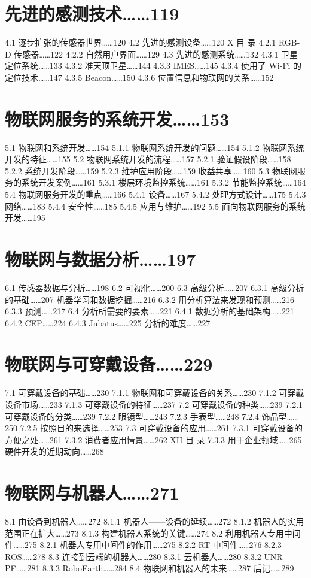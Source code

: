 \documentclass[12pt,UTF8]{ctexbook}
\begin{document}
\chapter{先进的感测技术……119}
4.1
逐步扩张的传感器世界……120
4.2
先进的感测设备……120
X
目
录
4.2.1
RGB-D 传感器……122
4.2.2
自然用户界面……129
4.3
先进的感测系统……132
4.3.1
卫星定位系统……133
4.3.2
准天顶卫星……144
4.3.3
IMES……145
4.3.4
使用了 Wi-Fi 的定位技术……147
4.3.5
Beacon……150
4.3.6
位置信息和物联网的关系……152

\chapter{物联网服务的系统开发……153}
5.1
物联网和系统开发……154
5.1.1
物联网系统开发的问题……154
5.1.2
物联网系统开发的特征……155
5.2
物联网系统开发的流程……157
5.2.1
验证假设阶段……158
5.2.2
系统开发阶段……159
5.2.3
维护应用阶段……159
收益共享……160
5.3
物联网服务的系统开发案例……161
5.3.1
楼层环境监控系统……161
5.3.2
节能监控系统……164
5.4
物联网服务开发的重点……166
5.4.1
设备……167
5.4.2
处理方式设计……175
5.4.3
网络……183
5.4.4
安全性……185
5.4.5
应用与维护……192
5.5
面向物联网服务的系统开发……195

\chapter{物联网与数据分析……197}
6.1
传感器数据与分析……198
6.2
可视化……200
6.3
高级分析……207
6.3.1
高级分析的基础……207
机器学习和数据挖掘……216
6.3.2
用分析算法来发现和预测……216
6.3.3
预测……217
6.4
分析所需要的要素……221
6.4.1
数据分析的基础架构……221
6.4.2
CEP……224
6.4.3
Jubatus……225
分析的难度……227

\chapter{物联网与可穿戴设备……229}
7.1
可穿戴设备的基础……230
7.1.1
物联网和可穿戴设备的关系……230
7.1.2
可穿戴设备市场……233
7.1.3
可穿戴设备的特征……237
7.2
可穿戴设备的种类……239
7.2.1
可穿戴设备的分类……239
7.2.2
眼镜型……243
7.2.3
手表型……248
7.2.4
饰品型……250
7.2.5
按照目的来选择……253
7.3
可穿戴设备的应用……261
7.3.1
可穿戴设备的方便之处……261
7.3.2
消费者应用情景……262
XII
目
录
7.3.3
用于企业领域……265
硬件开发的近期动向……268

\chapter{物联网与机器人……271}
8.1
由设备到机器人……272
8.1.1
机器人——设备的延续……272
8.1.2
机器人的实用范围正在扩大……273
8.1.3
构建机器人系统的关键……274
8.2
利用机器人专用中间件……275
8.2.1
机器人专用中间件的作用……275
8.2.2
RT 中间件……276
8.2.3
ROS……278
8.3
连接到云端的机器人……280
8.3.1
云机器人……280
8.3.2
UNR-PF……281
8.3.3
RoboEarth……284
8.4
物联网和机器人的未来……287
后记……289


\backmatter
\end{document}
